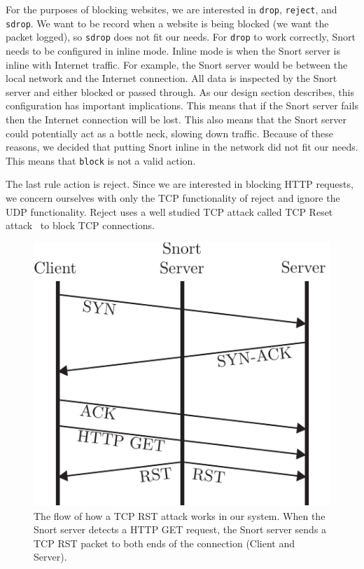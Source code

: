 For the purposes of blocking websites, we are interested in \texttt{drop},
\texttt{reject}, and \texttt{sdrop}. We want to be record when a website is
being blocked (we want the packet logged), so \texttt{sdrop} does not fit our
needs. For \texttt{drop} to work correctly, Snort needs to be configured in inline
mode. Inline mode is when the Snort server is inline with Internet traffic. For
example, the Snort server would be between the local network and the Internet
connection. All data is inspected by the Snort server and either blocked or
passed through. As our design section describes, this configuration has
important implications. This means that if the Snort server fails then the
Internet connection will be lost. This also means that the Snort server could
potentially act as a bottle neck, slowing down traffic. Because of these
reasons, we decided that putting Snort inline in the network did not fit our
needs. This means that \texttt{block} is not a valid action.

The last rule action is reject. Since we are interested in blocking HTTP
requests, we concern ourselves with only the TCP functionality of reject and
ignore the UDP functionality. Reject uses a well studied TCP attack called TCP
Reset attack~\cite{watson2004slipping} to block TCP connections.

\begin{figure}[!t]
    \centering
    \includegraphics[width=.8\columnwidth]{figures/tcp_reset}
    \caption{The flow of how a TCP RST attack works in our system. When the
    Snort server detects a HTTP GET request, the Snort server sends a TCP RST
    packet to both ends of the connection (Client and Server).}
    \label{fig:tcp_reset}
\end{figure}

